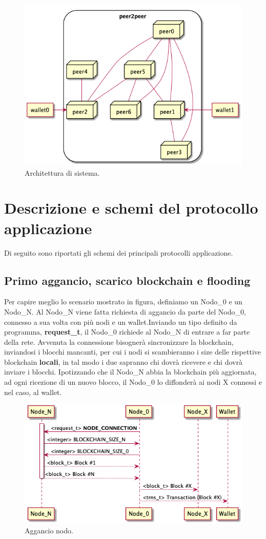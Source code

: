 \documentclass[a4paper,10pt]{report}
\begin{document}
  \begin{figure}[H]
  \center\includegraphics[scale=0.50]{arch.png}
  \caption{Architettura di sistema.}
  \end{figure}

  \chapter{Descrizione e schemi del protocollo applicazione}
  Di seguito sono riportati gli schemi dei principali protocolli applicazione.
  \section{Primo aggancio, scarico blockchain e flooding}
Per capire meglio lo scenario mostrato in figura, definiamo un Nodo\_0 e un Nodo\_N. Al Nodo\_N viene fatta richiesta di aggancio da parte del Nodo\_0, connesso a sua volta con più nodi e un wallet.\newline Inviando un tipo definito da programma, \textbf{request\_t}, il Nodo\_0 richiede al Nodo\_N di entrare a far parte della rete. Avvenuta la connessione bisognerà sincronizzare la blockchain, inviandosi i blocchi mancanti, per cui i nodi si scambieranno i size delle rispettive blockchain \textbf{locali}, in tal modo i due sapranno chi dovrà ricevere e chi dovrà inviare i blocchi. Ipotizzando che il Nodo\_N abbia la blockchain più aggiornata, ad ogni ricezione di un nuovo blocco, il Nodo\_0 lo diffonderà ai nodi X connessi e nel caso, al wallet.
  \begin{figure}[H]
  \center\includegraphics[scale=0.40]{hookpeer.png}
  \caption{Aggancio nodo.}
  \end{figure}
	\newpage
\end{document}
